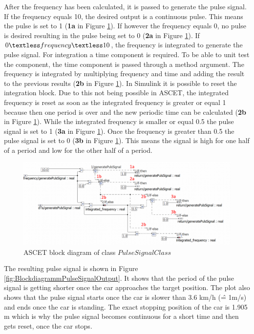 After the frequency has been calculated, it is passed to generate the pulse signal. If the frequency equals 10, the desired output is a continuous pulse. This means the pulse is set to 1 (\textbf{1a} in Figure \ref{fig:BlockdiagrammPulseSignal}). If however the frequency equals 0, no pulse is desired resulting in the pulse being set to 0 (\textbf{2a} in Figure \ref{fig:BlockdiagrammPulseSignal}). If $0 \textless frequency \textless 10$, the frequency is integrated to generate the pulse signal. For integration a time component is required. To be able to unit test the component, the time component is passed through a method argument. The frequency is integrated by multiplying frequency and time and adding the result to the previous results (\textbf{2b} in Figure \ref{fig:BlockdiagrammPulseSignal}). In Simulink it is possible to reset the integration block. Due to this not being possible in ASCET, the integrated frequency is reset as soon as the integrated frequency is greater or equal 1 because then one period is over and the new periodic time can be calculated (\textbf{2b} in Figure \ref{fig:BlockdiagrammPulseSignal}).  
While the integrated frequency is smaller or equal 0.5 the pulse signal is set to 1 (\textbf{3a} in Figure \ref{fig:BlockdiagrammPulseSignal}). Once the frequency is greater than 0.5 the pulse signal is set to 0 (\textbf{3b} in Figure \ref{fig:BlockdiagrammPulseSignal}). This means the signal is high for one half of a period and low for the other half of a period.

\begin{figure}[H]
\centering
\includegraphics[width=1\textwidth]{images/Blockdiagramm_PulseSignalClassAnno.png}
\caption{ASCET block diagram of class $PulseSignalClass$}
\label{fig:BlockdiagrammPulseSignal}
\end{figure}

The resulting pulse signal is shown in Figure \ref{fig:BlockdiagrammPulseSignalOutput}. It shows that the period of the pulse signal is getting shorter once the car approaches the target position. The plot also shows that the pulse signal starts once the car is slower than 3.6 km/h (\^= 1m/s) and ends once the car is standing. The exact stopping position of the car is 1.905 m which is why the pulse signal becomes continuous for a short time and then gets reset, once the car stops. 

